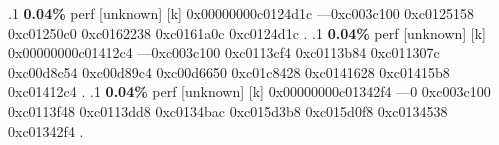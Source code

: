 \begin{profile}
{.1 \textbf{ 0.04\%} perf             [unknown]              [k] 0x00000000c0124d1c\newline {} ---0xc003c100\newline {} 0xc0125158\newline {} 0xc01250c0\newline {} 0xc0162238\newline {} 0xc0161a0c\newline {} 0xc0124d1c\newline {} . 
.1 \textbf{ 0.04\%} perf             [unknown]              [k] 0x00000000c01412c4\newline {} ---0xc003c100\newline {} 0xc0113cf4\newline {} 0xc0113b84\newline {} 0xc011307c\newline {} 0xc00d8c54\newline {} 0xc00d89c4\newline {} 0xc00d6650\newline {} 0xc01c8428\newline {} 0xc0141628\newline {} 0xc01415b8\newline {} 0xc01412c4\newline {} . 
.1 \textbf{ 0.04\%} perf             [unknown]              [k] 0x00000000c01342f4\newline {} ---0\newline {} 0xc003c100\newline {} 0xc0113f48\newline {} 0xc0113dd8\newline {} 0xc0134bac\newline {} 0xc015d3b8\newline {} 0xc015d0f8\newline {} 0xc0134538\newline {} 0xc01342f4\newline {} . 
}
\end{profile}
